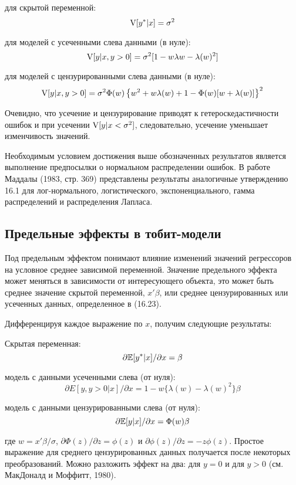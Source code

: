для скрытой переменной:
\begin{equation}
\mathrm{V}[y^* |x]=\sigma^2
\end{equation}

для моделей с усеченными слева данными (в нуле): 
\[
\mathrm{V}[y|x,y>0]=\sigma^2[1-w\lambda{w}-\lambda(w)^2]
\]

для моделей с цензурированными слева данными (в нуле):
\[
\mathrm{V}[y|x,y>0]={\sigma}^2\Phi(w)\left\lbrace w^2+w\lambda(w)+1-\Phi(w)[w+\lambda(w)]\right\rbrace^2
\]

Очевидно, что усечение и цензурирование приводят к гетероскедастичности ошибок и при усечении $\mathrm{V}[y|x<\sigma^2]$, следовательно, усечение уменьшает изменчивость значений.

Необходимым условием достижения выше обозначенных результатов является выполнение предпосылки о нормальном распределении ошибок. В работе Маддалы (1983, стр. 369) представлены результаты аналогичные утверждению 16.1 для лог-нормального, логистического, экспоненциального, гамма распределений и распределения Лапласа.

\subsection{Предельные эффекты в тобит-модели}

Под предельным эффектом понимают влияние изменений значений регрессоров на условное среднее зависимой переменной. Значение предельного эффекта может меняться в зависимости от интересующего объекта, это может быть среднее значение скрытой переменной, $x'\beta$,  или среднее цензурированных или усеченных данных, определенное в (16.23).

Дифференцируя каждое выражение по $x$, получим следующие результаты:


Скрытая переменная: 
\begin{equation}
\partial \mathbb{E}[y^* |x]/{\partial{x}}=\beta
\end{equation}

модель с данными усеченными слева (от нуля): 
\[
\partial{E}[y,y>0|x]/{\partial}x={1-w\lbrace\lambda}(w)-\lambda(w)^2\rbrace\beta
\]


модель с данными цензурированными слева (от нуля): 
\[
\partial \mathbb{E}[y|x]/\partial x=\Phi(w)\beta
\]



где $w=x'\beta/\sigma$, $\partial\Phi(z)/\partial{z}=\phi(z)$ и $\partial\phi(z)/\partial{z}=-z\phi{(z)}$. Простое выражение для среднего цензурированных данных получается после некоторых преобразований. Можно разложить эффект на два: для $y=0$ и для $y>0$ (см. МакДоналд и Моффитт, 1980).

